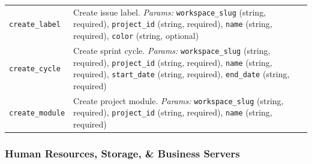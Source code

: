 \documentclass{article}
\theoremstyle{plain}
\theoremstyle{definition}
\theoremstyle{remark}
\begin{document}
{\begin{longtable}{p{4.5cm} p{10cm}}
\texttt{create\_label} & Create issue label. \textit{Params:} \texttt{workspace\_slug} (string, required), \texttt{project\_id} (string, required), \texttt{name} (string, required), \texttt{color} (string, optional) \\

\texttt{create\_cycle} & Create sprint cycle. \textit{Params:} \texttt{workspace\_slug} (string, required), \texttt{project\_id} (string, required), \texttt{name} (string, required), \texttt{start\_date} (string, required), \texttt{end\_date} (string, required) \\

\texttt{create\_module} & Create project module. \textit{Params:} \texttt{workspace\_slug} (string, required), \texttt{project\_id} (string, required), \texttt{name} (string, required) \\

\end{longtable}
}

\subsubsection{Human Resources, Storage, \& Business Servers}
\end{document}
